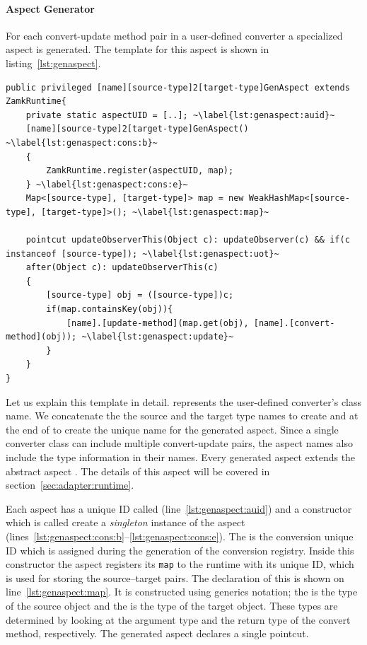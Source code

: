 \paragraph{Aspect Generator}
For each convert-update method pair in a user-defined converter a specialized aspect is generated. The template for this aspect is shown in listing~\ref{lst:genaspect}. 


\begin{lstlisting}[float, caption={The code generation template for producing an adaptation-specific aspect}, label={lst:genaspect}]
public privileged [name][source-type]2[target-type]GenAspect extends ZamkRuntime{
	private static aspectUID = [..]; ~\label{lst:genaspect:auid}~
	[name][source-type]2[target-type]GenAspect() ~\label{lst:genaspect:cons:b}~
	{
		ZamkRuntime.register(aspectUID, map);
	} ~\label{lst:genaspect:cons:e}~
	Map<[source-type], [target-type]> map = new WeakHashMap<[source-type], [target-type]>(); ~\label{lst:genaspect:map}~
	
	pointcut updateObserverThis(Object c): updateObserver(c) && if(c instanceof [source-type]); ~\label{lst:genaspect:uot}~
	after(Object c): updateObserverThis(c)
	{
		[source-type] obj = ([source-type])c;
		if(map.containsKey(obj)){
			[name].[update-method](map.get(obj), [name].[convert-method](obj)); ~\label{lst:genaspect:update}~
		}	
	}
}
\end{lstlisting}




Let us explain this template in detail. 
\lstinln{[name]} represents the user-defined converter's class name. We concatenate the the source and the target type names to create  and  at the end of \lstinln{[name]} to create the unique name for the generated aspect.
Since a single converter class can include multiple convert-update pairs, the aspect names also include the type information in their names.
Every generated aspect extends the abstract aspect . 
The details of this aspect will be covered in section~\ref{sec:adapter:runtime}.

Each aspect has a unique ID called  (line~\ref{lst:genaspect:auid}) and a constructor which is called create a \emph{singleton} instance of the aspect (lines~\ref{lst:genaspect:cons:b}--\ref{lst:genaspect:cons:e}). 
The  is the conversion unique ID which is assigned during the generation of the conversion registry. 
Inside this constructor the aspect registers its \lstinline{map} to the \zamk runtime with its unique ID, which is used for storing the source--target pairs. The declaration of this  is shown on line~\ref{lst:genaspect:map}. 
It is constructed using generics notation; the  is the type of the source object and the  is the type of the target object. These types are determined by looking at the argument type and the return type of the convert method, respectively. 
The generated aspect declares a single pointcut.

